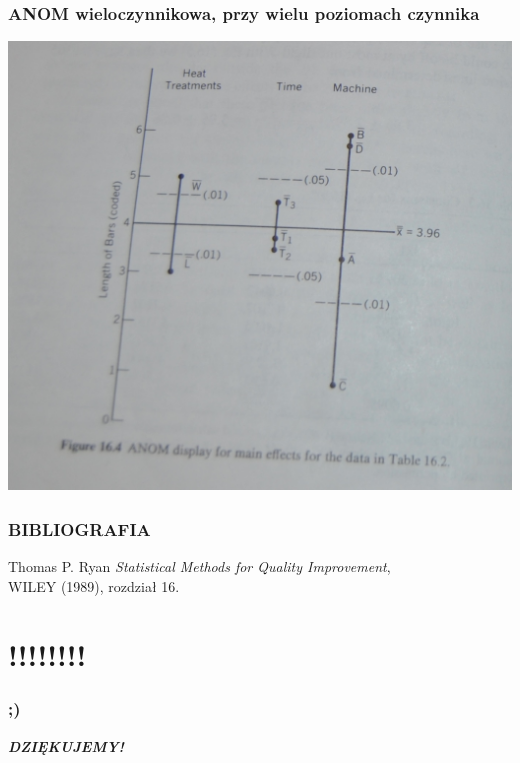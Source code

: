 \documentclass{beamer}
\begin{document}
\begin{frame}
\frametitle{ANOM wieloczynnikowa, przy wielu poziomach czynnika}
\begin{center}
\includegraphics[scale=0.8]{w.jpg}
\end{center}
\end{frame}


\begin{frame}
\frametitle{BIBLIOGRAFIA}
\begin{thebibliography}{99}
 Thomas P. Ryan 
\emph{Statistical Methods for Quality Improvement},\\ WILEY (1989), rozdział 16.

\end{thebibliography}
\end{frame}

\section{!!!!!!!!}	
	\begin{frame}
\frametitle{;)}
\center \Huge{\textsl{\textbf{DZIĘKUJEMY!}}}\\
\end{frame}	
\end{document}
